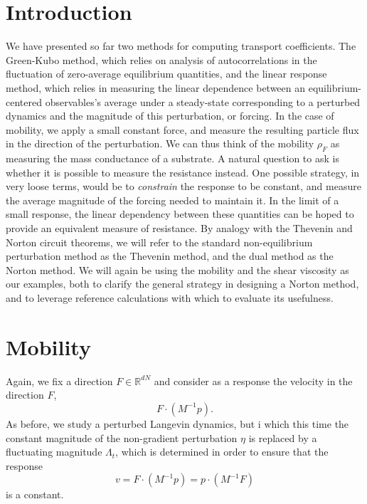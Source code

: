 \documentclass[a4paper,10pt,twoside,leqno]{report}
\newcommand{\R}{\mathbb{R}}
\newcommand{\1}{\mathbbm{1}}
\begin{document}
    
    \section{Introduction}
    We have presented so far two methods for computing transport coefficients. The Green-Kubo method, which relies on analysis of autocorrelations in the fluctuation of zero-average equilibrium quantities, 
    and the linear response method, which relies in measuring the linear dependence between an equilibrium-centered observables's average under a steady-state corresponding to a perturbed dynamics and the magnitude of this perturbation, or forcing.
    In the case of mobility, we apply a small constant force, and measure the resulting particle flux in the direction of the perturbation. We can thus think of the mobility $\rho_F$ as measuring the mass conductance of a substrate.
    A natural question to ask is whether it is possible to measure the resistance instead. One possible strategy, in very loose terms, would be to \textit{constrain} the response to be constant, and measure the average magnitude of the forcing needed to maintain it.
    In the limit of a small response, the linear dependency between these quantities can be hoped to provide an equivalent measure of resistance. By analogy with the Thevenin and Norton circuit theorems, we will refer to the standard non-equilibrium perturbation method as the Thevenin method,
    and the dual method as the Norton method. We will again be using the mobility and the shear viscosity as our examples, both to clarify the general strategy in designing a Norton method, and to leverage reference calculations with which to evaluate its usefulness. 
    
    \section{Mobility}
    Again, we fix a direction $F\in \R^{dN}$ and consider as a response the velocity in the direction $F$, \[F\cdot \left(M^{-1} p\right).\]
    As before, we study a perturbed Langevin dynamics, but i which this time the constant magnitude of the non-gradient perturbation $\eta$ is replaced by a fluctuating magnitude $\Lambda_t$, which is determined in order to ensure that the response
    \[v=F\cdot\left(M^{-1}p\right)=p\cdot\left(M^{-1}F\right)\]
    is a constant.
    
\end{document}
